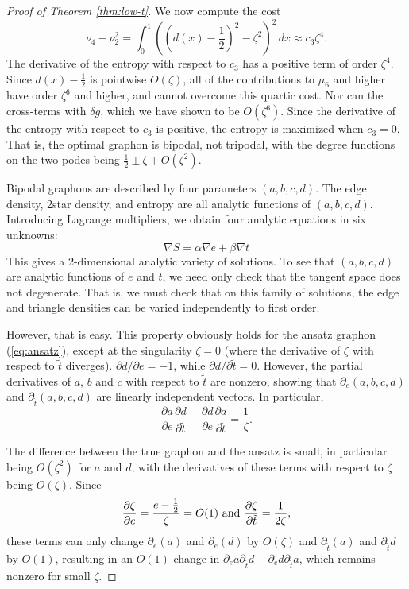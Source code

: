 \documentclass[10pt,a4paper]{amsart}
\begin{document}
\begin{proof}[Proof of Theorem \ref{thm:low-t}]
We now compute the cost 
\begin{equation} 
\nu_4 - \nu_2^2 = \int_0^1 ((d(x)-\frac12)^2-\zeta^2)^2 \, dx \approx c_3 \zeta^4. 
\end{equation} 
The derivative of the entropy with respect to $c_3$ has a positive term of order $\zeta^4$. Since $d(x)-\frac12$ is pointwise
$O(\zeta)$, all of the contributions to $\mu_6$ and higher have order $\zeta^6$ and higher, and cannot overcome this 
quartic cost. Nor can the cross-terms with $\delta g$, which we have shown to be $O(\zeta^6)$. Since the derivative of the 
entropy with respect to $c_3$ is positive, the entropy is maximized when $c_3=0$. That is, the optimal graphon is 
bipodal, not tripodal, with the degree functions on the two podes being $\frac12 \pm \zeta + O(\zeta^2)$. 

\smallskip

 Bipodal graphons are described by four parameters $(a,b,c,d)$. The edge density, 2star density, and 
entropy are all analytic functions of $(a,b,c,d)$. Introducing Lagrange multipliers, we obtain four 
analytic equations in six unknowns: 
\begin{equation}
\nabla S  =  \alpha \nabla e + \beta \nabla t 
\end{equation}
This gives a 2-dimensional analytic variety of solutions. To see that $(a,b,c,d)$ are analytic functions of $e$ and $t$,
we need only check that the tangent space does not degenerate. That is, we must check that on this family of solutions, 
the edge and triangle densities can be varied independently to first order. 

However, that is easy. This property obviously holds for the ansatz graphon (\ref{eq:ansatz}), except at the singularity 
$\zeta=0$ (where the derivative of $\zeta$ with respect to $\tilde t$ diverges). 
$\partial d/\partial e=-1$, while $\partial d/\partial \tilde t=0$. However, 
the partial derivatives of $a$, $b$ and $c$ with respect to $\tilde t$ are nonzero, showing
that $\partial_e(a,b,c,d)$ and $\partial_{\tilde t}(a,b,c,d)$ are linearly independent 
vectors. In particular, 
\begin{equation} 
\frac{\partial a}{\partial e} \frac{\partial d}{\partial \tilde t} - 
\frac{\partial d}{\partial e} \frac{\partial a}{\partial \tilde t} = \frac{1}{\zeta}.
\end{equation}

The difference between the true graphon and the ansatz is small, in particular being
$O(\zeta^2)$ for $a$ and $d$, with the derivatives of these terms with respect to 
$\zeta$ being $O(\zeta)$. Since 
\begin{equation}
\frac{\partial \zeta}{\partial e} = \frac{e-\frac12}{\zeta}=O(1) \hbox{ and }
\frac{\partial \zeta}{\partial \tilde t} = \frac{1}{2\zeta},
\end{equation}
these terms can only change $\partial_e(a)$ and $\partial_e(d)$ by $O(\zeta)$ and 
$\partial_{\tilde t}(a)$ and $\partial_{\tilde t}d$ by $O(1)$, resulting in an $O(1)$
change in $\partial_ea \partial_{\tilde t}d - \partial_e d \partial_{\tilde t}a$,
which remains nonzero for small $\zeta$. 

\end{proof}
\end{document}
